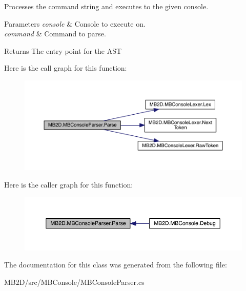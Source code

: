 Processes the command string and executes to the given console. 


\begin{DoxyParams}{Parameters}
{\em console} & Console to execute on.\\
\hline
{\em command} & Command to parse.\\
\hline
\end{DoxyParams}
\begin{DoxyReturn}{Returns}
The entry point for the A\+ST
\end{DoxyReturn}
Here is the call graph for this function\+:
\nopagebreak
\begin{figure}[H]
\begin{center}
\leavevmode
\includegraphics[width=350pt]{class_m_b2_d_1_1_m_b_console_parser_a880d5a9c56db05d19610df482b15bbf0_cgraph}
\end{center}
\end{figure}
Here is the caller graph for this function\+:
\nopagebreak
\begin{figure}[H]
\begin{center}
\leavevmode
\includegraphics[width=350pt]{class_m_b2_d_1_1_m_b_console_parser_a880d5a9c56db05d19610df482b15bbf0_icgraph}
\end{center}
\end{figure}


The documentation for this class was generated from the following file\+:\begin{DoxyCompactItemize}
\item 
M\+B2\+D/src/\+M\+B\+Console/M\+B\+Console\+Parser.\+cs\end{DoxyCompactItemize}
